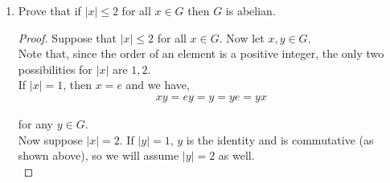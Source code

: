 \documentclass[11pt, reqno]{amsart}
\theoremstyle{plain}
\theoremstyle{definition}
\theoremstyle{example}
\begin{document}
\begin{enumerate}[1.]
\begin{enumerate}
\begin{proof}
So we have $|g^{-1}xg| = |x|$ in this case.\\

Now suppose $|x| = n > 1$. Then we can show that,
\begin{align*}
(g^{-1}xg)^n &= g^{-1}xg \cdot g^{-1}xg \cdots g^{-1}xg \cdot g^{-1}xg\\
&= g^{-1}x(gg^{-1})x(gg^{-1}) \cdots (gg^{-1}) x (gg^{-1})xg\\
&= g^{-1} x \cdot x \cdots x \cdot x \cdot g\\
&= g^{-1} x^n g\\
&= g^{-1} e g\\
&= g^{-1} g = e
\end{align*}

So $(g^{-1}xg)^n = e$.\\

Now suppose we select an $m$ such that $1 \leq m < n$. Then we have that,
\begin{align*}
(g^{-1}xg)^m &= g^{-1} x^m g
\end{align*}

Since $|x| = n$ and $1 \leq m < n$, we have that $x^m \neq e$, and thus $(g^{-1}xg)^m \neq e$.\\

Hence, $n$ is the least positive integer $k$ such that $(g^{-1}xg)^k = e$ and we have that $|g^{-1}xg| = n$

\end{proof}

\item Prove that if $|x| \leq 2$ for all $x \in G$ then $G$ is abelian.

\begin{proof}
Suppose that $|x| \leq 2$ for all $x \in G$. Now let $x, y \in G$.\\

Note that, since the order of an element is a positive integer, the only two possibilities for $|x|$ are $1, 2$.\\

If $|x| = 1$, then $x = e$ and we have,
\begin{align*}
xy = ey = y = ye = yx
\end{align*}

for any $y \in G$.\\

Now suppose $|x| = 2$. If $|y| = 1$, $y$ is the identity and is commutative (as shown above), so we will assume $|y| = 2$ as well.\\


\end{proof}
\end{enumerate}
\end{enumerate}
\end{document}
